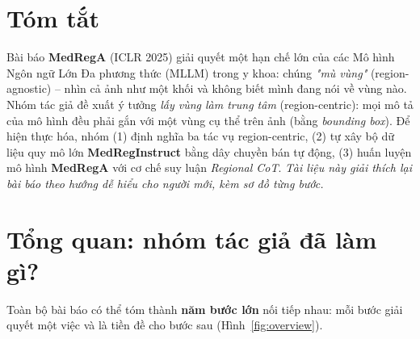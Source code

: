 \documentclass[12pt,a4paper,oneside]{extarticle}
\newcommand{\fact}[1]{#1}
\newcommand{\remark}[1]{\textit{#1}}
\newcommand{\important}[1]{\textbf{#1}}
\begin{document}
\renewcommand{\contentsname}{MỤC LỤC}
\tableofcontents
\newpage

\setcounter{page}{1}

\section*{Tóm tắt}

\fact{Bài báo \textbf{MedRegA} (ICLR 2025) giải quyết một hạn chế lớn của các Mô hình Ngôn ngữ
Lớn Đa phương thức (MLLM) trong y khoa: chúng \emph{"mù vùng"} (region-agnostic) -- nhìn cả ảnh
như một khối và không biết mình đang nói về vùng nào. Nhóm tác giả đề xuất ý tưởng \emph{lấy vùng
làm trung tâm} (region-centric): mọi mô tả của mô hình đều phải gắn với một vùng cụ thể trên ảnh
(bằng \emph{bounding box}). Để hiện thực hóa, nhóm (1) định nghĩa ba tác vụ region-centric,
(2) tự xây bộ dữ liệu quy mô lớn \textbf{MedRegInstruct} bằng dây chuyền bán tự động, (3) huấn
luyện mô hình \textbf{MedRegA} với cơ chế suy luận \emph{Regional CoT}.}
\remark{Tài liệu này giải thích lại bài báo theo hướng dễ hiểu cho người mới, kèm sơ đồ từng bước.}

\newpage

\section{Tổng quan: nhóm tác giả đã làm gì?}

\fact{Toàn bộ bài báo có thể tóm thành \important{năm bước lớn} nối tiếp nhau: mỗi bước giải
quyết một việc và là tiền đề cho bước sau (Hình~\ref{fig:overview}).}
\end{document}
